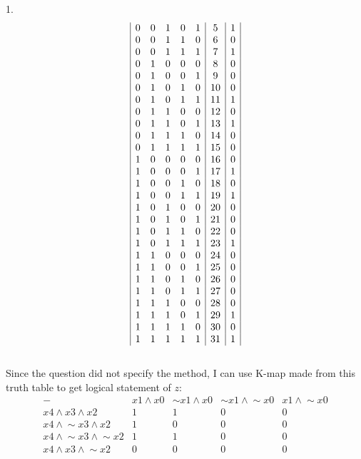 \documentclass[a4paper, 20pt]{article}
\def\lnot{\mathop{\sim}}
\begin{document}
\begin{question}{1.}
\begin{displaymath}
\begin{array}{|c c c c c|c|c|}
0 & 0 & 1 & 0 & 1 &5&1\\
0 & 0 & 1 & 1 & 0 &6&0\\
0 & 0 & 1 & 1 & 1 &7&1\\
0 & 1 & 0 & 0 & 0 &8&0\\
0 & 1 & 0 & 0 & 1 &9&0\\
0 & 1 & 0 & 1 & 0 &10&0\\
0 & 1 & 0 & 1 & 1 &11&1\\
0 & 1 & 1 & 0 & 0 &12&0\\
0 & 1 & 1 & 0 & 1 &13&1\\
0 & 1 & 1 & 1 & 0 &14&0\\
0 & 1 & 1 & 1 & 1 &15&0\\
1 & 0 & 0 & 0 & 0 &16&0\\
1 & 0 & 0 & 0 & 1 &17&1\\
1 & 0 & 0 & 1 & 0 &18&0\\
1 & 0 & 0 & 1 & 1 &19&1\\
1 & 0 & 1 & 0 & 0 &20&0\\
1 & 0 & 1 & 0 & 1 &21&0\\
1 & 0 & 1 & 1 & 0 &22&0\\
1 & 0 & 1 & 1 & 1 &23&1\\
1 & 1 & 0 & 0 & 0 &24&0\\
1 & 1 & 0 & 0 & 1 &25&0\\
1 & 1 & 0 & 1 & 0 &26&0\\
1 & 1 & 0 & 1 & 1 &27&0\\
1 & 1 & 1 & 0 & 0 &28&0\\
1 & 1 & 1 & 0 & 1 &29&1\\
1 & 1 & 1 & 1 & 0 &30&0\\
1 & 1 & 1 & 1 & 1 &31&1\\
\end{array}
\end{displaymath}
\\ Since the question did not specify the method, I can use K-map made from this truth table to get logical statement of $z$:
\\
\begin{displaymath}
\begin{array}{|c|c|c|c|c|}
- & x1 \land x0 & \lnot x1 \land x0 & \lnot x1 \land \lnot x0 & x1 \land \lnot x0 \\
\hline 
x4 \land x3 \land x2 & 1&1&0&0\\
x4 \land \lnot x3 \land x2 & 1&0&0&0\\
x4 \land \lnot x3 \land \lnot x2 & 1&1&0&0\\
x4 \land x3 \land \lnot x2 & 0&0&0&0\\

\end{array}
\end{displaymath}
\end{question}
\end{document}
